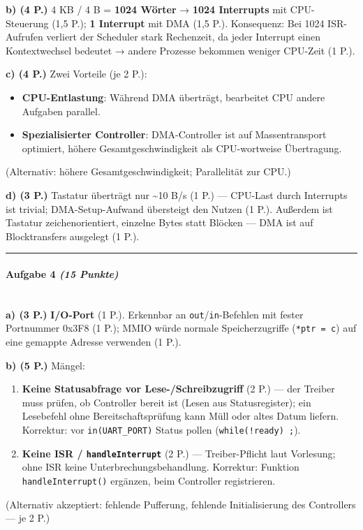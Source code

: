 \documentclass[11pt, a4paper]{article}
\begin{document}
\textbf{b) (4 P.)} 4 KB / 4 B = \textbf{1024 Wörter} → \textbf{1024 Interrupts} mit CPU-Steuerung (1,5 P.); \textbf{1 Interrupt} mit DMA (1,5 P.). Konsequenz: Bei 1024 ISR-Aufrufen verliert der Scheduler stark Rechenzeit, da jeder Interrupt einen Kontextwechsel bedeutet → andere Prozesse bekommen weniger CPU-Zeit (1 P.).


\textbf{c) (4 P.)} Zwei Vorteile (je 2 P.):

\begin{itemize}
  \item \textbf{CPU-Entlastung}: Während DMA überträgt, bearbeitet CPU andere Aufgaben parallel.
  \item \textbf{Spezialisierter Controller}: DMA-Controller ist auf Massentransport optimiert, höhere Gesamtgeschwindigkeit als CPU-wortweise Übertragung.
\end{itemize}
(Alternativ: höhere Gesamtgeschwindigkeit; Parallelität zur CPU.)


\textbf{d) (3 P.)} Tastatur überträgt nur \textasciitilde{}10 B/s (1 P.) — CPU-Last durch Interrupts ist trivial; DMA-Setup-Aufwand übersteigt den Nutzen (1 P.). Außerdem ist Tastatur zeichenorientiert, einzelne Bytes statt Blöcken — DMA ist auf Blocktransfers ausgelegt (1 P.).



\noindent\textcolor{rulegray}{\rule{\linewidth}{0.4pt}}


\paragraph{Aufgabe 4 \textit{(15 Punkte)}}\mbox{}\\[2pt]

\textbf{a) (3 P.)} \textbf{I/O-Port} (1 P.). Erkennbar an \texttt{out}/\texttt{in}-Befehlen mit fester Portnummer 0x3F8 (1 P.); MMIO würde normale Speicherzugriffe (\texttt{*ptr = c}) auf eine gemappte Adresse verwenden (1 P.).


\textbf{b) (5 P.)} Mängel:

\begin{enumerate}
  \item \textbf{Keine Statusabfrage vor Lese-/Schreibzugriff} (2 P.) — der Treiber muss prüfen, ob Controller bereit ist (Lesen aus Statusregister); ein Lesebefehl ohne Bereitschaftsprüfung kann Müll oder altes Datum liefern. Korrektur: vor \texttt{in(UART\_PORT)} Status pollen (\texttt{while(!ready) ;}).
  \item \textbf{Keine ISR / \texttt{handleInterrupt}} (2 P.) — Treiber-Pflicht laut Vorlesung; ohne ISR keine Unterbrechungsbehandlung. Korrektur: Funktion \texttt{handleInterrupt()} ergänzen, beim Controller registrieren.
\end{enumerate}
(Alternativ akzeptiert: fehlende Pufferung, fehlende Initialisierung des Controllers — je 2 P.)
\end{document}
